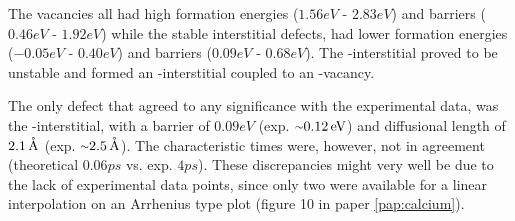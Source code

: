 The vacancies all had high formation energies ($1.56\unit{eV}$ - $2.83\unit{eV}$) and barriers ($0.46\unit{eV}$ - $1.92\unit{eV}$) while the stable interstitial defects, had lower formation energies ($-0.05\unit{eV}$ - $0.40\unit{eV}$) and barriers ($0.09\unit{eV}$ - $0.68\unit{eV}$).
The -interstitial proved to be unstable and formed an -interstitial coupled to an -vacancy.

The only defect that agreed to any significance with the experimental data, was the -interstitial, with a barrier of $0.09\unit{eV}$ (exp. $\mytilde0.12\unit{eV}$) and diffusional length of $2.1\, \mathrm{\mathring{\mathrm{A}}}$ (exp. $\mytilde2.5\unit{\mAA}$).
The characteristic times were, however, not in agreement (theoretical $0.06\unit{ps}$ vs. exp. $4\unit{ps}$).
These discrepancies might very well be due to the lack of experimental data points, since only two were available for a linear interpolation on an Arrhenius type plot (figure 10 in paper \ref{pap:calcium}).
